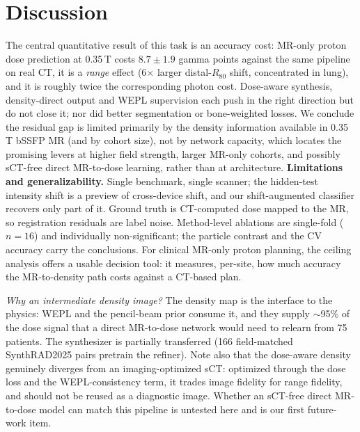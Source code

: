 \documentclass{llncs}
\begin{document}
\section{Discussion}
The central quantitative result of this task is an accuracy cost: MR-only proton dose prediction
at 0.35\,T costs $8.7\pm1.9$ gamma points against the same pipeline on real CT, it is a
\emph{range} effect (6$\times$ larger distal-$R_{80}$ shift, concentrated in lung), and it is
roughly twice the corresponding photon cost. Dose-aware synthesis, density-direct output and
WEPL supervision each push in the right direction but do not close it; nor did better
segmentation or bone-weighted losses. We conclude the residual gap is limited primarily by the
density information available in 0.35\,T bSSFP MR (and by cohort size), not by network
capacity, which locates the promising levers at higher field strength, larger MR-only cohorts,
and possibly sCT-free direct MR-to-dose learning, rather than at architecture.
\textbf{Limitations and generalizability.} Single benchmark, single scanner; the hidden-test
intensity shift is a preview of cross-device shift, and our shift-augmented classifier recovers
only part of it. Ground truth is CT-computed dose mapped to the MR, so registration residuals
are label noise. Method-level ablations are single-fold ($n{=}16$) and individually
non-significant; the particle contrast and the CV accuracy carry the conclusions. For clinical
MR-only proton planning, the ceiling analysis offers a usable decision tool: it measures,
per-site, how much accuracy the MR-to-density path costs against a CT-based plan.

\emph{Why an intermediate density image?} The density map is the interface to the
physics: WEPL and the pencil-beam prior consume it, and they supply $\sim$95\% of the dose
signal that a direct MR-to-dose network would need to relearn from 75 patients. The synthesizer
is partially transferred (166 field-matched SynthRAD2025 pairs pretrain the refiner). Note also
that the dose-aware density genuinely diverges from an imaging-optimized sCT: optimized through
the dose loss and the WEPL-consistency term, it trades image fidelity for range fidelity, and
should not be reused as a diagnostic image. Whether an sCT-free direct MR-to-dose model can
match this pipeline is untested here and is our first future-work item.
\end{document}

